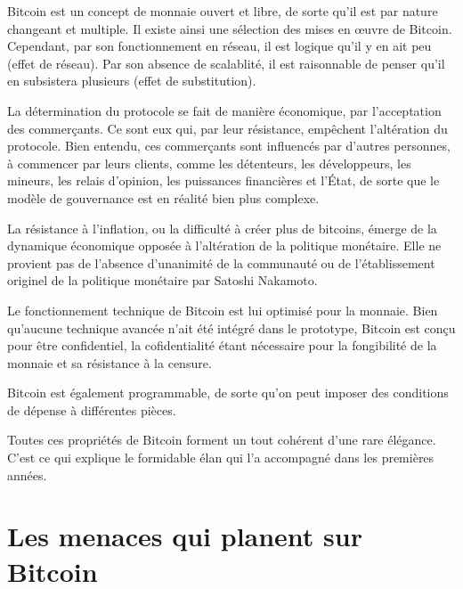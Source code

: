 Bitcoin est un concept de monnaie ouvert et libre, de sorte qu'il est par nature changeant et multiple. Il existe ainsi une sélection des mises en œuvre de Bitcoin. Cependant, par son fonctionnement en réseau, il est logique qu'il y en ait peu (effet de réseau). Par son absence de scalablité, il est raisonnable de penser qu'il en subsistera plusieurs (effet de substitution).

La détermination du protocole se fait de manière économique, par l'acceptation des commerçants. Ce sont eux qui, par leur résistance, empêchent l'altération du protocole. Bien entendu, ces commerçants sont influencés par d'autres personnes, à commencer par leurs clients, comme les détenteurs, les développeurs, les mineurs, les relais d'opinion, les puissances financières et l'État, de sorte que le modèle de gouvernance est en réalité bien plus complexe.

La résistance à l'inflation, ou la difficulté à créer plus de bitcoins, émerge de la dynamique économique opposée à l'altération de la politique monétaire. Elle ne provient pas de l'absence d'unanimité de la communauté ou de l'établissement originel de la politique monétaire par Satoshi Nakamoto.

Le fonctionnement technique de Bitcoin est lui optimisé pour la monnaie. Bien qu'aucune technique avancée n'ait été intégré dans le prototype, Bitcoin est conçu pour être confidentiel, la cofidentialité étant nécessaire pour la fongibilité de la monnaie et sa résistance à la censure.

Bitcoin est également programmable, de sorte qu'on peut imposer des conditions de dépense à différentes pièces.

Toutes ces propriétés de Bitcoin forment un tout cohérent d'une rare élégance. C'est ce qui explique le formidable élan qui l'a accompagné dans les premières années.


\section*{Les menaces qui planent sur Bitcoin}

